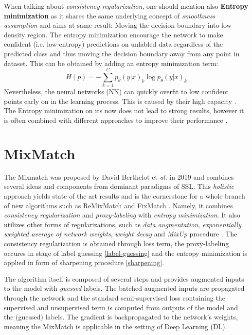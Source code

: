 When talking about \textit{consistency regularization}, one should mention also \textbf{Entropy minimization}\cite{entropy-min-2004} as it shares the same underlying concept
of \textit{smoothness assumption} and aims at same result: Moving the decision boundary into low-density region. The entropy minimization encourage the 
network to make confident (i.e. low-entropy) predictions on unlabled data regardless of the predicted class and thus moving the decision boundary away from any point in dataset.
This can be obtained by adding an entropy minimization term:
\begin{equation*}
    H(p) = -\sum_{k=1}^{C} p_\theta(y|x)_k \log p_\theta(y|x)_k
\end{equation*}
Nevertheless, the neural networks (NN) can quickly overfit to low confident points early on in the learning process. This is caused by their high capacity \cite{how-to-evalute-ssl-2018}.
The Entropy minimization on its now does not lead to strong results, however it is often combined with different approaches to improve their performance \cite{ssl-overview-2020}.

\section{MixMatch}
The Mixmatch was proposed by David Berthelot et \textit{al.} in 2019 \cite{mixmatch-2019} and combines several ideas and components from dominant paradigms of SSL.
This \textit{holistic} approach yields state of the art results and is the cornerstone for a whole branch of new algorithms such as ReMixMatch \cite{remixmatch-2020}
and FixMatch \cite{fixmatch-2020}. Namely, it combines \textit{consistency regularization} and \textit{proxy-labeling} with \textit{entropy minimization}.
It also utilizes other forms of regularizations, such as \textit{data augmentation}, \textit{exponentially weighted average of network weights}\cite{mean-teacher-2018},
\textit{weight decay} \cite{weight-decay-2019} and \textit{MixUp} procedure \cite{mixup-2018}. The consistency regularization is obtained through loss term, the 
proxy-labeling occures in stage of label guessing \ref{label-guessing} and the entropy minimization is applied in form of sharpening procedure \ref{sharpening}.

The algorithm itself is composed of several steps and provides augmented inputs to the model with \textit{guessed} labels. The batched augmented inputs are propagated 
through the network and the standard semi-supervised loss containing the supervised and unsupervised term is computed from outputs of the model and the (guessed) 
labels. The gradient is backpropagated to the network's weights, meaning the MixMatch is applicable in the setting of Deep Learning (DL).

